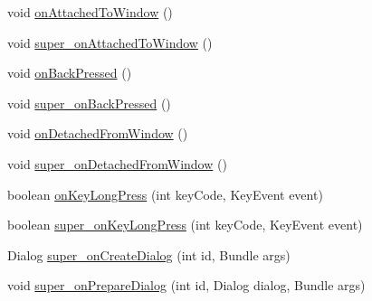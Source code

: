 \begin{DoxyCompactItemize}
\item 
void \hyperlink{classorg_1_1kde_1_1necessitas_1_1origo_1_1_qt_activity_aa67cb23bac189a70d0f5c49be3a905ca}{on\-Attached\-To\-Window} ()
\item 
void \hyperlink{classorg_1_1kde_1_1necessitas_1_1origo_1_1_qt_activity_ade599fd32ba832b23b6c84f183e59bbf}{super\-\_\-on\-Attached\-To\-Window} ()
\item 
void \hyperlink{classorg_1_1kde_1_1necessitas_1_1origo_1_1_qt_activity_a75f03346c82032f991c2a788d6bff33b}{on\-Back\-Pressed} ()
\item 
void \hyperlink{classorg_1_1kde_1_1necessitas_1_1origo_1_1_qt_activity_ad8678975c6074486143c04c601037497}{super\-\_\-on\-Back\-Pressed} ()
\item 
void \hyperlink{classorg_1_1kde_1_1necessitas_1_1origo_1_1_qt_activity_a495ee58db28efc2ca9293e21b1dd59a5}{on\-Detached\-From\-Window} ()
\item 
void \hyperlink{classorg_1_1kde_1_1necessitas_1_1origo_1_1_qt_activity_af2947b05392e6252d0f6f04dd3981b79}{super\-\_\-on\-Detached\-From\-Window} ()
\item 
boolean \hyperlink{classorg_1_1kde_1_1necessitas_1_1origo_1_1_qt_activity_abb975ef5df46397f50d5556fd5ca28f7}{on\-Key\-Long\-Press} (int key\-Code, Key\-Event event)
\item 
boolean \hyperlink{classorg_1_1kde_1_1necessitas_1_1origo_1_1_qt_activity_aeb8e6ff65bb972e9c6f9390d0d59a827}{super\-\_\-on\-Key\-Long\-Press} (int key\-Code, Key\-Event event)
\item 
Dialog \hyperlink{classorg_1_1kde_1_1necessitas_1_1origo_1_1_qt_activity_a963426613f6de6ff6d665b64c5a94315}{super\-\_\-on\-Create\-Dialog} (int id, Bundle args)
\item 
void \hyperlink{classorg_1_1kde_1_1necessitas_1_1origo_1_1_qt_activity_abd3cb4bf60bd28812cc36ab85769f7c9}{super\-\_\-on\-Prepare\-Dialog} (int id, Dialog dialog, Bundle args)
\end{DoxyCompactItemize}
